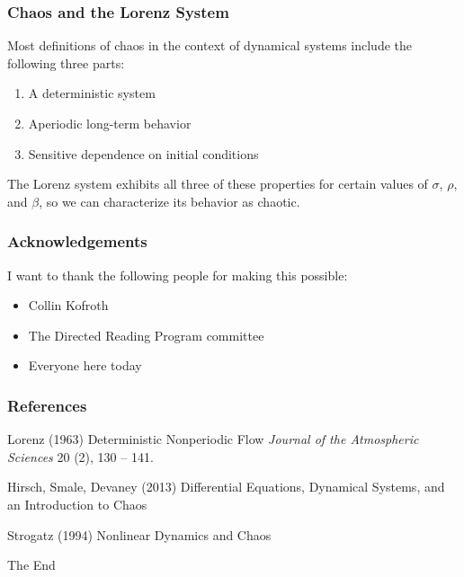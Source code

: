 \documentclass{beamer}
\begin{document}
\begin{frame}
    \frametitle{Chaos and the Lorenz System}
    Most definitions of chaos in the context of dynamical systems include the following three parts:

    \bigskip

    \begin{enumerate}
        \item{A deterministic system}
        \item{Aperiodic long-term behavior}
        \item{Sensitive dependence on initial conditions}
    \end{enumerate}

    \bigskip

    The Lorenz system exhibits all three of these properties for certain values of $\sigma$, $\rho$, and $\beta$, so we can characterize its behavior as chaotic.

\end{frame}


\begin{frame}
    \frametitle{Acknowledgements}
    I want to thank the following people for making this possible:
    \bigskip
    
    \begin{itemize}
        \item{Collin Kofroth}
        \item{The Directed Reading Program committee}
        \item{Everyone here today}
    \end{itemize}
\end{frame}


\begin{frame}
    \frametitle{References}
    \footnotesize{
    \begin{thebibliography}{99} %
         Lorenz (1963)
        \newblock Deterministic Nonperiodic Flow
        \newblock \emph{Journal of the Atmospheric Sciences} 20 (2), 130 -- 141.

         Hirsch, Smale, Devaney (2013)
        \newblock Differential Equations, Dynamical Systems, and an Introduction to Chaos

         Strogatz (1994)
        \newblock Nonlinear Dynamics and Chaos
    \end{thebibliography}
    }
\end{frame}


\begin{frame}
\Huge{\centerline{The End}}
\end{frame}

\end{document}
